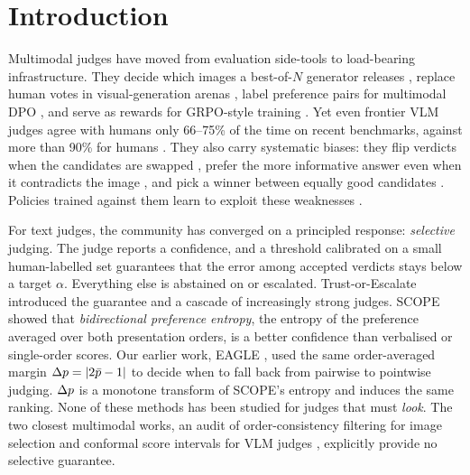 \section{Introduction}\label{sec:intro}

Multimodal judges have moved from evaluation side-tools to load-bearing infrastructure.
They decide which images a best-of-$N$ generator releases \citep{yin2026calibrate,seo2026when}, replace human votes in visual-generation arenas \citep{li2026ksort,li2026genarena}, label preference pairs for multimodal DPO \citep{yu2024rlaifv}, and serve as rewards for GRPO-style training \citep{wang2025prefgrpo}.
Yet even frontier VLM judges agree with humans only 66--75\% of the time on recent benchmarks, against more than 90\% for humans \citep{hu2025multimodal}.
They also carry systematic biases: they flip verdicts when the candidates are swapped \citep{huang2026do,chen2024mllmasajudge}, prefer the more informative answer even when it contradicts the image \citep{zou2026when}, and pick a winner between equally good candidates \citep{khan2026seeing}. Policies trained against them learn to exploit these weaknesses \citep{yao2026multimodal}.

For text judges, the community has converged on a principled response: \emph{selective} judging.
The judge reports a confidence, and a threshold calibrated on a small human-labelled set guarantees that the error among accepted verdicts stays below a target $\alpha$. Everything else is abstained on or escalated.
Trust-or-Escalate \citep{jung2024trust} introduced the guarantee and a cascade of increasingly strong judges.
SCOPE \citep{badshah2026scope} showed that \emph{bidirectional preference entropy}, the entropy of the preference averaged over both presentation orders, is a better confidence than verbalised or single-order scores.
Our earlier work, EAGLE \citep{eagle2026}, used the same order-averaged margin $\Delta p=|2\bar p-1|$ to decide when to fall back from pairwise to pointwise judging. $\Delta p$ is a monotone transform of SCOPE's entropy and induces the same ranking.
None of these methods has been studied for judges that must \emph{look}. The two closest multimodal works, an audit of order-consistency filtering for image selection \citep{seo2026when} and conformal score intervals for VLM judges \citep{kumar2026vlm}, explicitly provide no selective guarantee.

